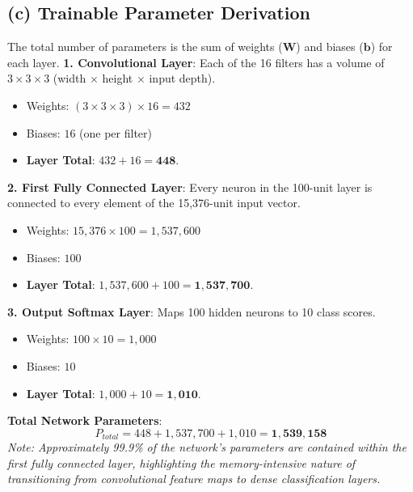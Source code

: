 \subsection*{(c) Trainable Parameter Derivation}
The total number of parameters is the sum of weights ($\bm{W}$) and biases ($
\bm{b}$) for each layer.
\textbf{1. Convolutional Layer}:
Each of the 16 filters has a volume of $3 \times 3 \times 3$ (width $\times$ height $
\times$ input depth).
\begin{itemize}
 \item Weights: $(3 \times 3 \times 3) \times 16 = 432$
 \item Biases: $16$ (one per filter)
 \item \textbf{Layer Total}: $432 + 16 = \bm{448}$.
\end{itemize}
\textbf{2. First Fully Connected Layer}:
Every neuron in the 100-unit layer is connected to every element of the 15,376-unit
input vector.
\begin{itemize}
 \item Weights: $15,376 \times 100 = 1,537,600$
 \item Biases: $100$
 \item \textbf{Layer Total}: $1,537,600 + 100 = \bm{1,537,700}$.
\end{itemize}
\textbf{3. Output Softmax Layer}:
Maps 100 hidden neurons to 10 class scores.
\begin{itemize}
 \item Weights: $100 \times 10 = 1,000$
 \item Biases: $10$
 \item \textbf{Layer Total}: $1,000 + 10 = \bm{1,010}$.
\end{itemize}
\textbf{Total Network Parameters}:
\begin{equation*}
P_{total} = 448 + 1,537,700 + 1,010 = \bm{1,539,158}
\end{equation*}
\textit{Note: Approximately 99.9\% of the network's parameters are contained within
the first fully connected layer, highlighting the memory-intensive nature of
transitioning from convolutional feature maps to dense classification layers.}